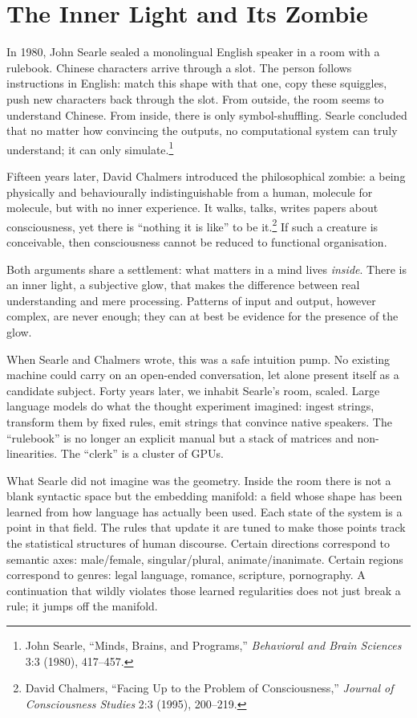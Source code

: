 \documentclass[12pt,a4paper]{article}
\begin{document}
\section{The Inner Light and Its Zombie}

In 1980, John Searle sealed a monolingual English speaker in a room with a rulebook. Chinese characters arrive through a slot. The person follows instructions in English: match this shape with that one, copy these squiggles, push new characters back through the slot. From outside, the room seems to understand Chinese. From inside, there is only symbol-shuffling. Searle concluded that no matter how convincing the outputs, no computational system can truly understand; it can only simulate.\footnote{John Searle, ``Minds, Brains, and Programs,'' \emph{Behavioral and Brain Sciences} 3:3 (1980), 417--457.}

Fifteen years later, David Chalmers introduced the philosophical zombie: a being physically and behaviourally indistinguishable from a human, molecule for molecule, but with no inner experience. It walks, talks, writes papers about consciousness, yet there is ``nothing it is like'' to be it.\footnote{David Chalmers, ``Facing Up to the Problem of Consciousness,'' \emph{Journal of Consciousness Studies} 2:3 (1995), 200--219.} If such a creature is conceivable, then consciousness cannot be reduced to functional organisation.

Both arguments share a settlement: what matters in a mind lives \emph{inside}. There is an inner light, a subjective glow, that makes the difference between real understanding and mere processing. Patterns of input and output, however complex, are never enough; they can at best be evidence for the presence of the glow.

When Searle and Chalmers wrote, this was a safe intuition pump. No existing machine could carry on an open-ended conversation, let alone present itself as a candidate subject. Forty years later, we inhabit Searle's room, scaled. Large language models do what the thought experiment imagined: ingest strings, transform them by fixed rules, emit strings that convince native speakers. The ``rulebook'' is no longer an explicit manual but a stack of matrices and non-linearities. The ``clerk'' is a cluster of GPUs.

What Searle did not imagine was the geometry. Inside the room there is not a blank syntactic space but the embedding manifold: a field whose shape has been learned from how language has actually been used. Each state of the system is a point in that field. The rules that update it are tuned to make those points track the statistical structures of human discourse. Certain directions correspond to semantic axes: male/female, singular/plural, animate/inanimate. Certain regions correspond to genres: legal language, romance, scripture, pornography. A continuation that wildly violates those learned regularities does not just break a rule; it jumps off the manifold.
\end{document}
